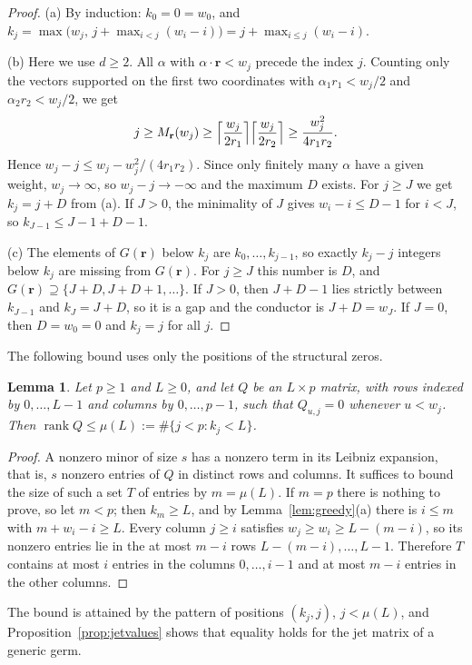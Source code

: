 \documentclass{amsart}
\newtheorem{lemma}[theorem]{Lemma}
\theoremstyle{definition}
\numberwithin{equation}{section}
\newcommand{\bfr}{\mathbf{r}}
\newcommand{\rank}{\operatorname{rank}}
\begin{document}
\begin{proof}
(a) By induction: $k_0=0=w_0$, and
$k_j=\max\bigl(w_j,\,j+\max_{i<j}(w_i-i)\bigr)=j+\max_{i\le j}(w_i-i)$.

(b) Here we use $d\ge2$. All $\alpha$ with $\alpha\cdot\bfr<w_j$ precede the
index $j$. Counting only the vectors supported on the first two coordinates
with $\alpha_1r_1<w_j/2$ and $\alpha_2r_2<w_j/2$, we get
\[
  j\ge M_{\bfr}(w_j)\ge
  \Bigl\lceil\frac{w_j}{2r_1}\Bigr\rceil\Bigl\lceil\frac{w_j}{2r_2}\Bigr\rceil
  \ge\frac{w_j^2}{4r_1r_2}.
\]
Hence $w_j-j\le w_j-w_j^2/(4r_1r_2)$. Since only finitely many $\alpha$ have a given
weight, $w_j\to\infty$, so $w_j-j\to-\infty$ and the maximum $D$ exists. For
$j\ge J$ we get $k_j=j+D$ from (a). If $J>0$, the minimality of $J$ gives
$w_i-i\le D-1$ for $i<J$, so $k_{J-1}\le J-1+D-1$.

(c) The elements of $G(\bfr)$ below $k_j$ are $k_0,\dots,k_{j-1}$, so exactly
$k_j-j$ integers below $k_j$ are missing from $G(\bfr)$. For $j\ge J$ this
number is $D$, and $G(\bfr)\supseteq\{J+D,J+D+1,\dots\}$. If $J>0$, then
$J+D-1$ lies strictly between $k_{J-1}$ and $k_J=J+D$, so it is a gap and the
conductor is $J+D=w_J$. If $J=0$, then $D=w_0=0$ and $k_j=j$ for all $j$.
\end{proof}

The following bound uses only the positions of the structural zeros.

\begin{lemma}\label{lem:matching}
Let $p\ge1$ and $L\ge0$, and let $Q$ be an $L\times p$ matrix, with rows
indexed by $0,\dots,L-1$ and columns by $0,\dots,p-1$, such that $Q_{u,j}=0$
whenever $u<w_j$. Then $\rank Q\le\mu(L):=\#\{j<p:k_j<L\}$.
\end{lemma}

\begin{proof}
A nonzero minor of size $s$ has a nonzero term in its Leibniz expansion, that
is, $s$ nonzero entries of $Q$ in distinct rows and columns. It suffices to
bound the size of such a set $T$ of entries by $m=\mu(L)$. If $m=p$ there is
nothing to prove, so let $m<p$; then $k_m\ge L$, and by
Lemma~\ref{lem:greedy}(a) there is $i\le m$ with $m+w_i-i\ge L$. Every column
$j\ge i$ satisfies $w_j\ge w_i\ge L-(m-i)$, so its nonzero entries lie in the
at most $m-i$ rows $L-(m-i),\dots,L-1$. Therefore $T$ contains at most $i$
entries in the columns $0,\dots,i-1$ and at most $m-i$ entries in the other
columns.
\end{proof}

The bound is attained by the pattern of positions $(k_j,j)$, $j<\mu(L)$, and
Proposition~\ref{prop:jetvalues} shows that equality holds for the jet matrix of
a generic germ.
\end{document}
